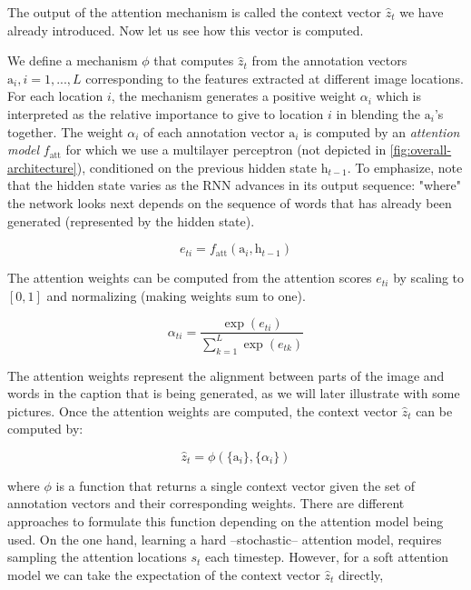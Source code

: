 The output of the attention mechanism is called the context vector $\hat{z}_t$ we have already introduced. Now let us see how this vector is computed.

We define a mechanism $\phi$ that computes $\hat{z}_t$ from the annotation vectors $\text{a}_i, i =1,...,L$ corresponding to the features extracted at different image locations. For each location $i$, the mechanism generates a positive weight $\alpha_i$ which is interpreted as the relative importance to give to location $i$ in blending the $\text{a}_i$'s together. The weight $\alpha_i$ of each annotation vector $\text{a}_i$ is computed by an \textit{attention model} $f_\text{att}$ for which we use a multilayer perceptron (not depicted in \cref{fig:overall-architecture}), conditioned on the previous hidden state $\text{h}_{t-1}$. To emphasize, note that the hidden state varies as the RNN advances in its output sequence: "where" the network looks next depends on the sequence of words that has already been generated (represented by the hidden state).

\begin{equation}\label{eq:att-scores}
 e_{ti} = f_\text{att}(\text{a}_i, \text{h}_{t-1})  
\end{equation}

The attention weights can be computed from the attention scores $e_{ti}$ by scaling to $[0,1]$ and normalizing (making weights sum to one).

\begin{equation}\label{eq:att-weights}
\alpha_{ti} = \frac{\exp{(e_{ti})}}{\sum_{k=1}^L \exp{(e_{tk})}}
\end{equation}

The attention weights represent the alignment between parts of the image and words in the caption that is being generated, as we will later illustrate with some pictures. Once the attention weights are computed, the context vector $\hat{z}_t$ can be computed by:

\begin{equation}\label{eq:att-context-1}
\hat{z}_t = \phi (\{\text{a}_i\},\{\alpha_i\})
\end{equation}

where $\phi$ is a function that returns a single context vector given the set of annotation vectors and their corresponding weights. There are different approaches to formulate this function depending on the attention model being used. On the one hand, learning a hard --stochastic-- attention model, requires sampling the attention locations $s_t$ each timestep. However, for a soft attention model we can take the expectation of the context vector $\hat{z}_t$ directly,

